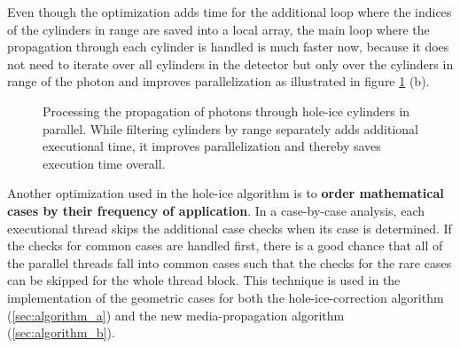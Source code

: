Even though the optimization adds time for the additional loop where the
indices of the cylinders in range are saved into a local array, the main
loop where the propagation through each cylinder is handled is much
faster now, because it does not need to iterate over all cylinders in
the detector but only over the cylinders in range of the photon and
improves parallelization as illustrated in figure \ref{fig:ceiV8Yai}
(b).


\begin{figure}[htbp]
  \hfill
  \caption{Processing the propagation of photons through hole-ice cylinders in parallel. While filtering cylinders by range separately adds additional executional time, it improves parallelization and thereby saves execution time overall.}
  \label{fig:ceiV8Yai}
\end{figure}

Another optimization used in the hole-ice algorithm is to
\textbf{order mathematical cases by their frequency of application}. In
a case-by-case analysis, each executional thread skips the additional
case checks when its case is determined. If the checks for common cases
are handled first, there is a good chance that all of the parallel
threads fall into common cases such that the checks for the rare cases
can be skipped for the whole thread block. This technique is used in the
implementation of the geometric cases for both the hole-ice-correction
algorithm (\ref{sec:algorithm_a}) and the new media-propagation
algorithm (\ref{sec:algorithm_b}).

